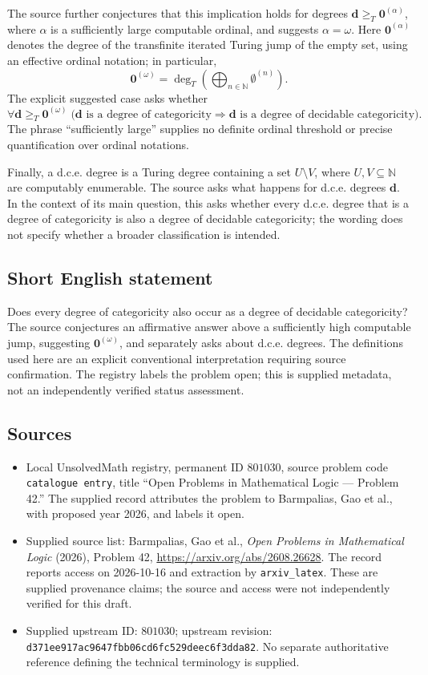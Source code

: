 \documentclass[11pt]{article}
\newcommand{\N}{\mathbb{N}}
\begin{document}
The source further conjectures that this implication holds for degrees \(\mathbf d\geq_T\mathbf 0^{(\alpha)}\), where \(\alpha\) is a sufficiently large computable ordinal, and suggests \(\alpha=\omega\). Here \(\mathbf 0^{(\alpha)}\) denotes the degree of the transfinite iterated Turing jump of the empty set, using an effective ordinal notation; in particular,
\[
\mathbf 0^{(\omega)}=\deg_T\!\left(\bigoplus_{n\in\N}\emptyset^{(n)}\right).
\]
The explicit suggested case asks whether
\[
\forall\mathbf d\geq_T\mathbf 0^{(\omega)}\;\bigl(\mathbf d\text{ is a degree of categoricity}
\Longrightarrow
\mathbf d\text{ is a degree of decidable categoricity}\bigr).
\]
The phrase ``sufficiently large'' supplies no definite ordinal threshold or precise quantification over ordinal notations.

Finally, a d.c.e. degree is a Turing degree containing a set \(U\setminus V\), where \(U,V\subseteq\N\) are computably enumerable. The source asks what happens for d.c.e. degrees \(\mathbf d\). In the context of its main question, this asks whether every d.c.e. degree that is a degree of categoricity is also a degree of decidable categoricity; the wording does not specify whether a broader classification is intended.
\subsection{Short English statement}
Does every degree of categoricity also occur as a degree of decidable categoricity? The source conjectures an affirmative answer above a sufficiently high computable jump, suggesting \(\mathbf 0^{(\omega)}\), and separately asks about d.c.e. degrees. The definitions used here are an explicit conventional interpretation requiring source confirmation. The registry labels the problem open; this is supplied metadata, not an independently verified status assessment.
\subsection{Sources}
\begin{itemize}
\item Local UnsolvedMath registry, permanent ID \(801030\), source problem code \texttt{catalogue entry}, title ``Open Problems in Mathematical Logic --- Problem 42.'' The supplied record attributes the problem to Barmpalias, Gao et al., with proposed year 2026, and labels it open.
\item Supplied source list: Barmpalias, Gao et al., \emph{Open Problems in Mathematical Logic} (2026), Problem 42, \url{https://arxiv.org/abs/2608.26628}. The record reports access on 2026-10-16 and extraction by \texttt{arxiv\_latex}. These are supplied provenance claims; the source and access were not independently verified for this draft.
\item Supplied upstream ID: \(801030\); upstream revision: \texttt{d371ee917ac9647fbb06cd6fc529deec6f3dda82}. No separate authoritative reference defining the technical terminology is supplied.
\end{itemize}
\end{document}
